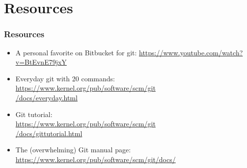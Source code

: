 %
%
\section{
  Resources
}

\begin{frame}
  \frametitle{
    Resources
  }

  \begin{itemize}%
  \item
    A personal favorite on Bitbucket for git:
    \href{https://www.youtube.com/watch?v=BtEvnE79jxY}{https://www.youtube.com/watch?v=BtEvnE79jxY}
  \item
    Everyday git with 20 commands:\\
    \href{https://www.kernel.org/pub/software/scm/git/docs/everyday.html}{https://www.kernel.org/pub/software/scm/git\\/docs/everyday.html}
  \item
    Git tutorial:\\
    \href{https://www.kernel.org/pub/software/scm/git/docs/gittutorial.html}{https://www.kernel.org/pub/software/scm/git\\/docs/gittutorial.html}
  \item
    The (overwhelming) Git manual page:\\
    \href{https://www.kernel.org/pub/software/scm/git/docs/}{https://www.kernel.org/pub/software/scm/git/docs/}
  \end{itemize}

\end{frame}
